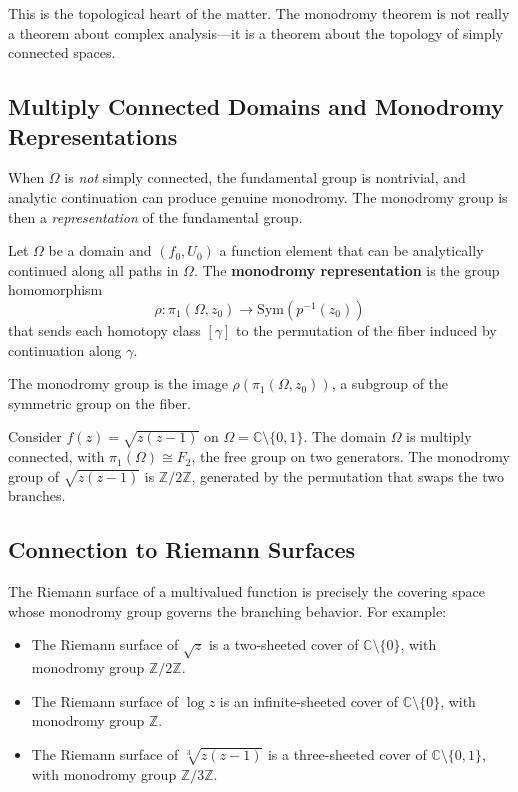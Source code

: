 This is the topological heart of the matter. The monodromy theorem is not really a theorem about complex analysis---it is a theorem about the topology of simply connected spaces.

\subsection{Multiply Connected Domains and Monodromy Representations}

When $\Omega$ is \emph{not} simply connected, the fundamental group is nontrivial, and analytic continuation can produce genuine monodromy. The monodromy group is then a \emph{representation} of the fundamental group.

\begin{definition}
Let $\Omega$ be a domain and $(f_0, U_0)$ a function element that can be analytically continued along all paths in $\Omega$. The \textbf{monodromy representation} is the group homomorphism
\[
    \rho \colon \pi_1(\Omega, z_0) \to \mathrm{Sym}(p^{-1}(z_0))
\]
that sends each homotopy class $[\gamma]$ to the permutation of the fiber induced by continuation along $\gamma$.
\end{definition}

The monodromy group is the image $\rho(\pi_1(\Omega, z_0))$, a subgroup of the symmetric group on the fiber.

\begin{example}
Consider $f(z) = \sqrt{z(z-1)}$ on $\Omega = \mathbb{C} \setminus \{0, 1\}$. The domain $\Omega$ is multiply connected, with $\pi_1(\Omega) \cong F_2$, the free group on two generators. The monodromy group of $\sqrt{z(z-1)}$ is $\mathbb{Z}/2\mathbb{Z}$, generated by the permutation that swaps the two branches.
\end{example}

\subsection{Connection to Riemann Surfaces}

The Riemann surface of a multivalued function is precisely the covering space whose monodromy group governs the branching behavior. For example:

\begin{itemize}
    \item The Riemann surface of $\sqrt{z}$ is a two-sheeted cover of $\mathbb{C} \setminus \{0\}$, with monodromy group $\mathbb{Z}/2\mathbb{Z}$.
    \item The Riemann surface of $\log z$ is an infinite-sheeted cover of $\mathbb{C} \setminus \{0\}$, with monodromy group $\mathbb{Z}$.
    \item The Riemann surface of $\sqrt[3]{z(z-1)}$ is a three-sheeted cover of $\mathbb{C} \setminus \{0, 1\}$, with monodromy group $\mathbb{Z}/3\mathbb{Z}$.
\end{itemize}

